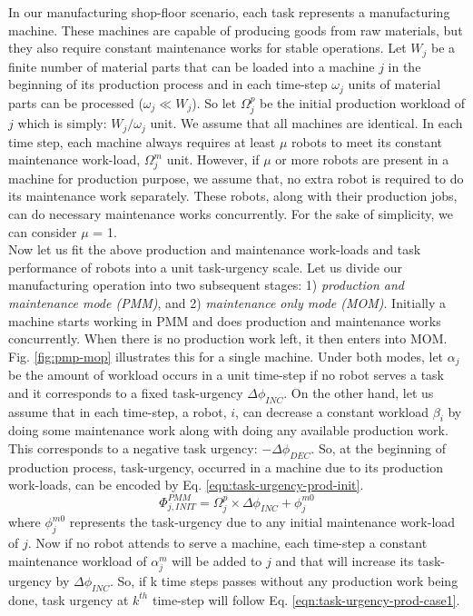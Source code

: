 \documentclass{llncs}
\begin{document}
In our manufacturing shop-floor scenario, each task represents a manufacturing machine. These machines are capable of producing goods from raw materials, but they also require constant maintenance works for stable operations. Let $W_{j}$ be a finite number of material parts that can be loaded into a machine $j$ in the beginning of its production process and in each time-step $\omega_{j}$ units of material parts can be processed  ($\omega_{j} \ll W_{j} $). So let $\Omega_{j}^{p}$ be the initial production workload of $j$ which is simply: $W_{j} / \omega_{j}$ unit. We assume that all machines are identical. In each time step, each machine always requires at least $\mu$ robots to meet its constant maintenance work-load, $\Omega_{j}^{m}$ unit. However, if $\mu$ or more robots are present in a machine for production purpose, we assume that, no extra robot is required to do its maintenance work separately. These robots, along with their production jobs, can do necessary maintenance works concurrently. For the sake of simplicity, we can consider $\mu$ = 1.\\
Now let us fit the above production and maintenance work-loads and task performance of robots into a unit task-urgency scale. Let us divide our manufacturing operation into two subsequent stages: 1) {\em production and maintenance mode (PMM)}, and 2) {\em maintenance only mode (MOM)}. Initially a machine starts working in PMM and does production and maintenance works concurrently. When there is no production work left, it then enters into MOM. Fig. \ref{fig:pmp-mop} illustrates this for a single machine.
Under both modes, let $\alpha_{j}$ be the amount of workload occurs in a unit time-step if no robot serves a task and it corresponds to a fixed task-urgency $\Delta \phi_{INC}$. On the other hand, let us assume that in each time-step, a robot, $i$, can decrease a constant workload $\beta_{i}$ by doing some maintenance work along with doing any available production work. This  corresponds to a negative task urgency: $- \Delta \phi_{DEC}$. 
So, at the beginning of production process, task-urgency, occurred in a machine due to its production work-loads, can be encoded by Eq. \ref{eqn:task-urgency-prod-init}.
\begin{equation}
\Phi_{j, INIT}^{PMM} = \Omega_{j}^{p} \times \Delta \phi_{INC} + \phi_{j}^{m0}
\label{eqn:task-urgency-prod-init}
\end{equation}
where $\phi_{j}^{m0}$ represents the task-urgency due to any initial maintenance work-load of $j$.
Now if no robot attends to serve a machine, each time-step a constant maintenance workload of $\alpha_{j}^{m}$ will be added to $j$ and that will increase its task-urgency by $\Delta \phi_{INC}$. So, if k time steps passes without any production work being done, task urgency at $k^{th}$ time-step will follow Eq. \ref{eqn:task-urgency-prod-case1}.
\end{document}
